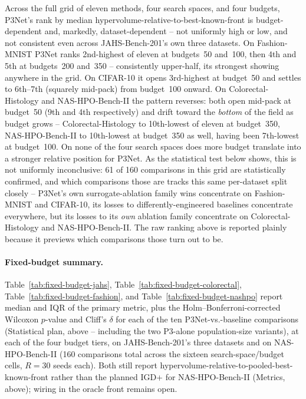 Across the full grid of eleven methods, four search spaces, and four budgets, P3Net's rank by median
hypervolume-relative-to-best-known-front is budget-dependent and, markedly, dataset-dependent -- not
uniformly high or low, and not consistent even across JAHS-Bench-201's own three datasets. On
Fashion-MNIST P3Net ranks 2nd-highest of eleven at budgets~50 and~100, then 4th and 5th at budgets~200
and~350 -- consistently upper-half, its strongest showing anywhere in the grid. On CIFAR-10 it opens
3rd-highest at budget~50 and settles to 6th--7th (squarely mid-pack) from budget~100 onward. On
Colorectal-Histology and NAS-HPO-Bench-II the pattern reverses: both open mid-pack at budget~50 (9th and
4th respectively) and drift toward the \emph{bottom} of the field as budget grows -- Colorectal-Histology to
10th-lowest of eleven at budget~350, NAS-HPO-Bench-II to 10th-lowest at budget~350 as well, having been
7th-lowest at budget~100. On none of the four search spaces does more budget translate into a stronger
relative position for P3Net. As the statistical test below shows, this is not uniformly inconclusive: 61 of
160 comparisons in this grid are statistically confirmed, and which comparisons those are tracks this same
per-dataset split closely -- P3Net's own surrogate-ablation family wins concentrate on Fashion-MNIST and
CIFAR-10, its losses to differently-engineered baselines concentrate everywhere, but its losses to its
\emph{own} ablation family concentrate on Colorectal-Histology and NAS-HPO-Bench-II. The raw ranking above
is reported plainly because it previews which comparisons those turn out to be.

\paragraph{Fixed-budget summary.} Table~\ref{tab:fixed-budget-jahs}, Table~\ref{tab:fixed-budget-colorectal},
Table~\ref{tab:fixed-budget-fashion}, and Table~\ref{tab:fixed-budget-nashpo} report median and IQR of the
primary metric, plus the Holm--Bonferroni-corrected Wilcoxon $p$-value and Cliff's $\delta$ for each of the
ten P3Net-vs.-baseline comparisons (Statistical plan, above -- including the two P3-alone population-size
variants), at each of the four budget tiers, on JAHS-Bench-201's three datasets and on NAS-HPO-Bench-II
(160 comparisons total across the sixteen search-space/budget cells, $R=30$ seeds each). Both still report
hypervolume-relative-to-pooled-best-known-front rather than the planned IGD+ for NAS-HPO-Bench-II (Metrics,
above); wiring in the oracle front remains open.

